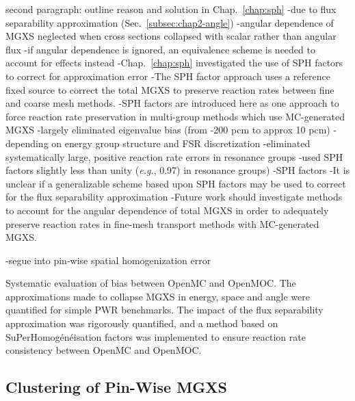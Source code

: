 second paragraph: outline reason and solution in Chap.~\ref{chap:sph}
-due to flux separability approximation (Sec.~\ref{subsec:chap2-angle})
  -angular dependence of \ac{MGXS} neglected when cross sections collapsed with scalar rather than angular flux
  -if angular dependence is ignored, an equivalence scheme is needed to account for effects instead
-Chap.~\ref{chap:sph} investigated the use of \ac{SPH} factors to correct for approximation error
  -The \ac{SPH} factor approach uses a reference fixed source to correct the total \ac{MGXS} to preserve reaction rates between fine and coarse mesh methods.
  -SPH factors are introduced here as one approach to force reaction rate preservation in multi-group methods which use MC-generated MGXS
-largely eliminated eigenvalue bias (from -200 \ac{pcm} to approx 10 \ac{pcm})
  -depending on energy group structure and \ac{FSR} discretization
-eliminated systematically large, positive reaction rate errors in resonance groups
-used \ac{SPH} factors slightly less than unity (\textit{e.g.}, 0.97) in resonance groups)
-\ac{SPH} factors
-It is unclear if a generalizable scheme based upon SPH factors may be used to correct for the flux separability approximation
-Future work should investigate methods to account for the angular dependence of total MGXS in order to adequately preserve reaction rates in fine-mesh transport methods with MC-generated MGXS.

-segue into pin-wise spatial homogenization error

Systematic evaluation of bias between OpenMC and OpenMOC. The approximations made to collapse MGXS in energy, space and angle were quantified for simple PWR benchmarks. The impact of the flux separability approximation was rigorously quantified, and a method based on SuPerHomogénéisation factors was implemented to ensure reaction rate consistency between OpenMC and OpenMOC.

\subsection{Clustering of Pin-Wise MGXS}
\label{subsec:chap12-mgxs-clustering}

